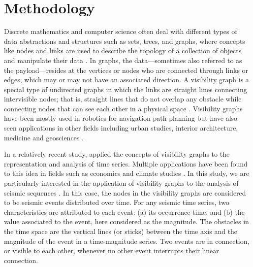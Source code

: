 
\section{Methodology}

Discrete mathematics and computer science often deal with different types of data abstractions and structures such as sets, trees, and graphs, where concepts like nodes and links are used to describe the topology of a collection of objects and manipulate their data \citep[e.g.,][]{Skiena_2008_Book}. In graphs, the data---sometimes also referred to as the payload---resides at the vertices or nodes who are connected through links or edges, which may or may not have an associated direction. A visibility graph is a special type of undirected graphs in which the links are straight lines connecting intervisible nodes; that is, straight lines that do not overlap any obstacle while connecting nodes that can see each other in a physical space \citep{LozanoPerez_1979_CACM}. Visibility graphs have been mostly used in robotics for navigation path planning \citep[e.g.,][]{Huang_2004_Proc, Oommen_1987_JRA} but have also seen applications in other fields including urban studies, interior architecture, medicine and geosciences \citep[e.g.,][]{Raman_2010_UE, Ahmadlou_2010_JNT, Varoudis_2014_JSS, Phillips_2015_ESR}.

In a relatively recent study, \citet{Lacasa2008} applied the concepts of visibility graphs to the representation and analysis of time series. Multiple applications have been found to this idea in fields such as economics \citep{Yang_2009_PA, Wang2012} and climate studies \citep{Elsner_2009_GRL}. In this study, we are particularly interested in the application of visibility graphs to the analysis of seismic sequences \citep{Telesca2012}. In this case, the nodes in the visibility graphs are considered to be seismic events distributed over time. For any seismic time series, two characteristics are attributed to each event: (a) its occurrence time, and (b) the value associated to the event, here considered as the magnitude. The obstacles in the time space are the vertical lines (or sticks) between the time axis and the magnitude of the event in a time-magnitude series. Two events are in connection, or visible to each other, whenever no other event interrupts their linear connection.

